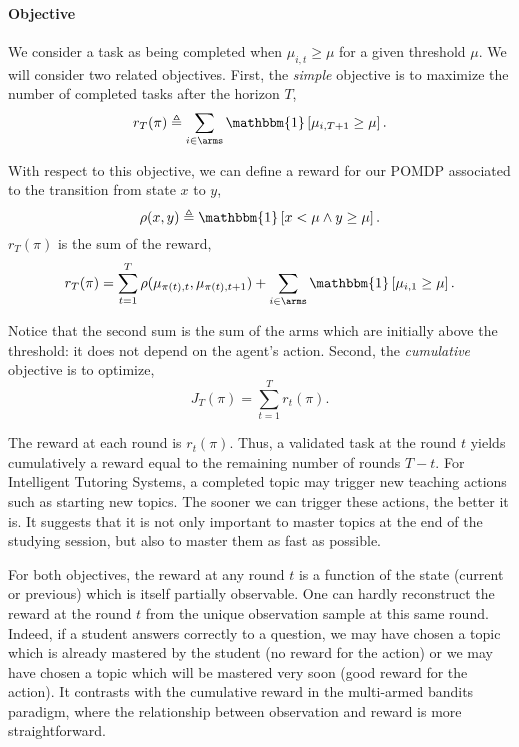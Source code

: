 \paragraph{Objective}
We consider a task as being completed when
$\mu_{i,t} \geq \mu$ for a given threshold $\mu$. We will consider two related objectives. First, the \textit{simple} objective is to maximize the number of completed tasks after the horizon $T$, 
\[
r_T(\pi) \triangleq \sum_{i \in \arms} \mathbbm{1}\left[\mu_{i,T+1} \geq \mu \right].
\]

With respect to this objective, we can define a reward for our POMDP associated to the transition from state $x$ to $y$,  \[\rho(x, y) \triangleq \mathbbm{1}\left[x<\mu \land y \geq \mu\right].\]
 $r_T(\pi)$ is the sum of the reward,
\begin{equation}
\label{eq:link-r-rho}
r_T(\pi) = \sum_{t=1}^T \rho(\mu_{\pi(t), t},\mu_{\pi(t), t+1}) + \sum_{i\in \arms} \mathbbm{1}\left[\mu_{i,1} \geq \mu \right].
\end{equation}

Notice that the second sum is the sum of the arms which are initially above the threshold: it does not depend on the agent's action. Second, the \textit{cumulative} objective is to optimize,
\[
J_T(\pi) = \sum_{t=1}^T r_t(\pi).
\]

The reward at each round is $r_t(\pi)$. Thus, a validated task at the round $t$ yields cumulatively a reward equal to the remaining number of rounds $T-t$. For Intelligent Tutoring Systems, a completed topic may trigger new teaching actions such as starting new topics. The sooner we can trigger these actions, the better it is. It suggests that it is not only important to master topics at the end of the studying session, but also to master them as fast as possible. 

\begin{remark}
For both objectives, the reward at any round $t$ is a function of the state (current or previous) which is itself partially observable. One can hardly reconstruct the reward at the round $t$ from the unique observation sample at this same round. Indeed, if a student answers correctly to a question, we may have chosen a topic which is already mastered by the student (no reward for the action) or we may have chosen a topic which will be mastered very soon (good reward for the action). It contrasts with the cumulative reward in the multi-armed bandits paradigm, where the relationship between observation and reward is more straightforward.
\end{remark}

